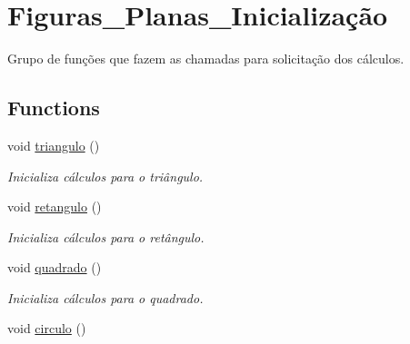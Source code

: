 \hypertarget{group__Figuras__Planas__Inicializa_xC3_xA7_xC3_xA3o}{}\section{Figuras\+\_\+\+Planas\+\_\+\+Inicialização}
\label{group__Figuras__Planas__Inicializa_xC3_xA7_xC3_xA3o}


Grupo de funções que fazem as chamadas para solicitação dos cálculos.  


\subsection*{Functions}
\begin{DoxyCompactItemize}
\item 
void \hyperlink{group__Figuras__Planas__Inicializa_xC3_xA7_xC3_xA3o_ga8928cef04d4cd48e92adf3569f6d185b}{triangulo} ()\hypertarget{group__Figuras__Planas__Inicializa_xC3_xA7_xC3_xA3o_ga8928cef04d4cd48e92adf3569f6d185b}{}\label{group__Figuras__Planas__Inicializa_xC3_xA7_xC3_xA3o_ga8928cef04d4cd48e92adf3569f6d185b}

\begin{DoxyCompactList}\small\item\em Inicializa cálculos para o triângulo. \end{DoxyCompactList}\item 
void \hyperlink{group__Figuras__Planas__Inicializa_xC3_xA7_xC3_xA3o_gafa7da114af5845aed90385aaad07745f}{retangulo} ()\hypertarget{group__Figuras__Planas__Inicializa_xC3_xA7_xC3_xA3o_gafa7da114af5845aed90385aaad07745f}{}\label{group__Figuras__Planas__Inicializa_xC3_xA7_xC3_xA3o_gafa7da114af5845aed90385aaad07745f}

\begin{DoxyCompactList}\small\item\em Inicializa cálculos para o retângulo. \end{DoxyCompactList}\item 
void \hyperlink{group__Figuras__Planas__Inicializa_xC3_xA7_xC3_xA3o_ga59a769deb5a89245b0b2a7760179708e}{quadrado} ()\hypertarget{group__Figuras__Planas__Inicializa_xC3_xA7_xC3_xA3o_ga59a769deb5a89245b0b2a7760179708e}{}\label{group__Figuras__Planas__Inicializa_xC3_xA7_xC3_xA3o_ga59a769deb5a89245b0b2a7760179708e}

\begin{DoxyCompactList}\small\item\em Inicializa cálculos para o quadrado. \end{DoxyCompactList}\item 
void \hyperlink{group__Figuras__Planas__Inicializa_xC3_xA7_xC3_xA3o_ga28482bc381ce414df86e4fdb9e3e6da5}{circulo} ()\hypertarget{group__Figuras__Planas__Inicializa_xC3_xA7_xC3_xA3o_ga28482bc381ce414df86e4fdb9e3e6da5}{}\label{group__Figuras__Planas__Inicializa_xC3_xA7_xC3_xA3o_ga28482bc381ce414df86e4fdb9e3e6da5}


\end{DoxyCompactItemize}
